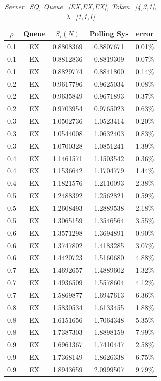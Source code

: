 \documentclass[12pt,a4paper,italian]{article}
\begin{document}
\begin{table}[h!]
	\begin{minipage}[b]{0.48\linewidth}\centering
		\centering
		\caption{\scriptsize \emph{Server=SQ, Queue=[EX,EX,EX], Token=[4,3,1], $\lambda$=[1,1,1]}}
		\label{tab5}
		\tiny
		\begin{tabular}{c c c c c}
			\hline
			$\rho$ & Queue & $S_i(N)$ & Polling Sys & error \\ \hline
		0.1 & EX & 0.8808369 &   0.8807671    & 0.01\% \\
		0.1 & EX & 0.8812836 &   0.8819309    & 0.07\% \\
		0.1 & EX & 0.8829774 &   0.8841800    & 0.14\% \\ \hline \hline
		0.2 & EX & 0.9617796 &   0.9625034    & 0.08\% \\
		0.2 & EX & 0.9635849 &   0.9671893    & 0.37\% \\
		0.2 & EX & 0.9703954 &   0.9765023    & 0.63\% \\ \hline \hline
		0.3 & EX & 1.0502736 &   1.0523414    & 0.20\% \\
		0.3 & EX & 1.0544008 &   1.0632403    & 0.83\% \\
		0.3 & EX & 1.0700328 &   1.0851241    & 1.39\% \\ \hline \hline
		0.4 & EX & 1.1461571 &   1.1503542    & 0.36\% \\
		0.4 & EX & 1.1536642 &   1.1704779    & 1.44\% \\
		0.4 & EX & 1.1821576 &   1.2110093    & 2.38\% \\ \hline \hline
		0.5 & EX & 1.2488392 &   1.2562821    & 0.59\% \\
		0.5 & EX & 1.2608493 &   1.2889538    & 2.18\% \\
		0.5 & EX & 1.3065159 &   1.3546564    & 3.55\% \\ \hline \hline
		0.6 & EX & 1.3571298 &   1.3694891    & 0.90\% \\
		0.6 & EX & 1.3747802 &   1.4183285    & 3.07\% \\
		0.6 & EX & 1.4420723 &   1.5160680    & 4.88\% \\ \hline \hline
		0.7 & EX & 1.4692657 &   1.4889602    & 1.32\% \\
		0.7 & EX & 1.4936509 &   1.5578604    & 4.12\% \\
		0.7 & EX & 1.5869877 &   1.6947613    & 6.36\% \\ \hline \hline
		0.8 & EX & 1.5830534 &   1.6133455    & 1.88\% \\
		0.8 & EX & 1.6151656 &   1.7064348    & 5.35\% \\
		0.8 & EX & 1.7387303 &   1.8898159    & 7.99\% \\ \hline \hline
		0.9 & EX & 1.6961367 &   1.7410447    & 2.58\% \\
		0.9 & EX & 1.7368149 &   1.8626338    & 6.75\% \\
		0.9 & EX & 1.8943659 &   2.0999507    & 9.79\% \\\hline
			

\end{tabular}
\end{minipage}
\end{table}
\end{document}
